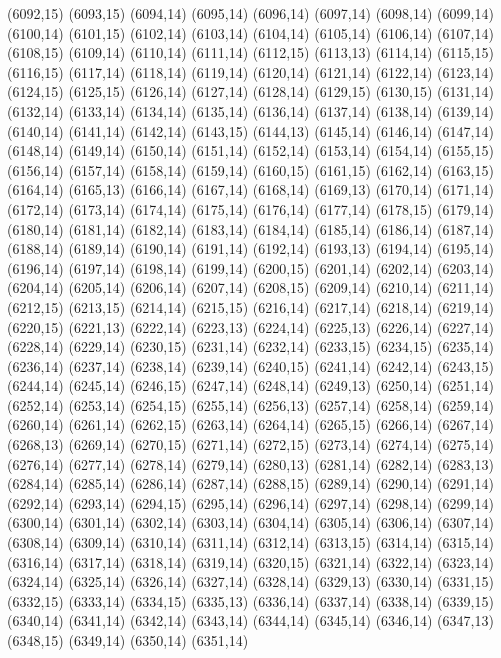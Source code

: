 (6092,15)
(6093,15)
(6094,14)
(6095,14)
(6096,14)
(6097,14)
(6098,14)
(6099,14)
(6100,14)
(6101,15)
(6102,14)
(6103,14)
(6104,14)
(6105,14)
(6106,14)
(6107,14)
(6108,15)
(6109,14)
(6110,14)
(6111,14)
(6112,15)
(6113,13)
(6114,14)
(6115,15)
(6116,15)
(6117,14)
(6118,14)
(6119,14)
(6120,14)
(6121,14)
(6122,14)
(6123,14)
(6124,15)
(6125,15)
(6126,14)
(6127,14)
(6128,14)
(6129,15)
(6130,15)
(6131,14)
(6132,14)
(6133,14)
(6134,14)
(6135,14)
(6136,14)
(6137,14)
(6138,14)
(6139,14)
(6140,14)
(6141,14)
(6142,14)
(6143,15)
(6144,13)
(6145,14)
(6146,14)
(6147,14)
(6148,14)
(6149,14)
(6150,14)
(6151,14)
(6152,14)
(6153,14)
(6154,14)
(6155,15)
(6156,14)
(6157,14)
(6158,14)
(6159,14)
(6160,15)
(6161,15)
(6162,14)
(6163,15)
(6164,14)
(6165,13)
(6166,14)
(6167,14)
(6168,14)
(6169,13)
(6170,14)
(6171,14)
(6172,14)
(6173,14)
(6174,14)
(6175,14)
(6176,14)
(6177,14)
(6178,15)
(6179,14)
(6180,14)
(6181,14)
(6182,14)
(6183,14)
(6184,14)
(6185,14)
(6186,14)
(6187,14)
(6188,14)
(6189,14)
(6190,14)
(6191,14)
(6192,14)
(6193,13)
(6194,14)
(6195,14)
(6196,14)
(6197,14)
(6198,14)
(6199,14)
(6200,15)
(6201,14)
(6202,14)
(6203,14)
(6204,14)
(6205,14)
(6206,14)
(6207,14)
(6208,15)
(6209,14)
(6210,14)
(6211,14)
(6212,15)
(6213,15)
(6214,14)
(6215,15)
(6216,14)
(6217,14)
(6218,14)
(6219,14)
(6220,15)
(6221,13)
(6222,14)
(6223,13)
(6224,14)
(6225,13)
(6226,14)
(6227,14)
(6228,14)
(6229,14)
(6230,15)
(6231,14)
(6232,14)
(6233,15)
(6234,15)
(6235,14)
(6236,14)
(6237,14)
(6238,14)
(6239,14)
(6240,15)
(6241,14)
(6242,14)
(6243,15)
(6244,14)
(6245,14)
(6246,15)
(6247,14)
(6248,14)
(6249,13)
(6250,14)
(6251,14)
(6252,14)
(6253,14)
(6254,15)
(6255,14)
(6256,13)
(6257,14)
(6258,14)
(6259,14)
(6260,14)
(6261,14)
(6262,15)
(6263,14)
(6264,14)
(6265,15)
(6266,14)
(6267,14)
(6268,13)
(6269,14)
(6270,15)
(6271,14)
(6272,15)
(6273,14)
(6274,14)
(6275,14)
(6276,14)
(6277,14)
(6278,14)
(6279,14)
(6280,13)
(6281,14)
(6282,14)
(6283,13)
(6284,14)
(6285,14)
(6286,14)
(6287,14)
(6288,15)
(6289,14)
(6290,14)
(6291,14)
(6292,14)
(6293,14)
(6294,15)
(6295,14)
(6296,14)
(6297,14)
(6298,14)
(6299,14)
(6300,14)
(6301,14)
(6302,14)
(6303,14)
(6304,14)
(6305,14)
(6306,14)
(6307,14)
(6308,14)
(6309,14)
(6310,14)
(6311,14)
(6312,14)
(6313,15)
(6314,14)
(6315,14)
(6316,14)
(6317,14)
(6318,14)
(6319,14)
(6320,15)
(6321,14)
(6322,14)
(6323,14)
(6324,14)
(6325,14)
(6326,14)
(6327,14)
(6328,14)
(6329,13)
(6330,14)
(6331,15)
(6332,15)
(6333,14)
(6334,15)
(6335,13)
(6336,14)
(6337,14)
(6338,14)
(6339,15)
(6340,14)
(6341,14)
(6342,14)
(6343,14)
(6344,14)
(6345,14)
(6346,14)
(6347,13)
(6348,15)
(6349,14)
(6350,14)
(6351,14)
